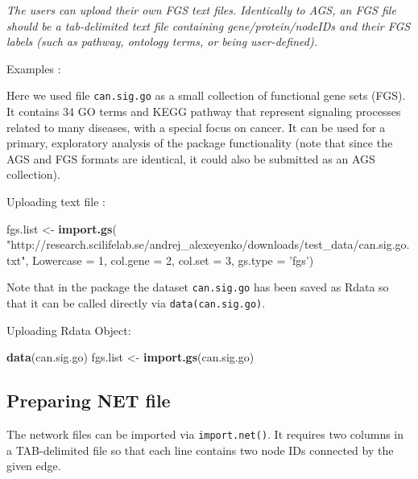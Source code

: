 \documentclass[]{article}
\newenvironment{Shaded}{\begin{snugshade}}{\end{snugshade}}
\newcommand{\KeywordTok}[1]{\textcolor[rgb]{0.13,0.29,0.53}{\textbf{#1}}}
\newcommand{\DataTypeTok}[1]{\textcolor[rgb]{0.13,0.29,0.53}{#1}}
\newcommand{\DecValTok}[1]{\textcolor[rgb]{0.00,0.00,0.81}{#1}}
\newcommand{\StringTok}[1]{\textcolor[rgb]{0.31,0.60,0.02}{#1}}
\newcommand{\NormalTok}[1]{#1}
\begin{document}
\emph{The users can upload their own FGS text files. Identically to AGS,
an FGS file should be a tab-delimited text file containing
gene/protein/nodeIDs and their FGS labels (such as pathway, ontology
terms, or being user-defined).}

Examples :

Here we used file \texttt{can.sig.go} as a small collection of
functional gene sets (FGS). It contains 34 GO terms and KEGG pathway
that represent signaling processes related to many diseases, with a
special focus on cancer. It can be used for a primary, exploratory
analysis of the package functionality (note that since the AGS and FGS
formats are identical, it could also be submitted as an AGS collection).

Uploading text file :

\begin{Shaded}
\begin{Highlighting}[]
\NormalTok{fgs.list <-}\StringTok{ }\KeywordTok{import.gs}\NormalTok{(}
\StringTok{"http://research.scilifelab.se/andrej_alexeyenko/downloads/test_data/can.sig.go.txt"}\NormalTok{,}
\DataTypeTok{Lowercase =} \DecValTok{1}\NormalTok{, }\DataTypeTok{col.gene =} \DecValTok{2}\NormalTok{, }\DataTypeTok{col.set =} \DecValTok{3}\NormalTok{, }\DataTypeTok{gs.type =} \StringTok{'fgs'}\NormalTok{)}
\end{Highlighting}
\end{Shaded}

Note that in the package the dataset \texttt{can.sig.go} has been saved
as Rdata so that it can be called directly via
\texttt{data(can.sig.go)}.

Uploading Rdata Object:

\begin{Shaded}
\begin{Highlighting}[]
\KeywordTok{data}\NormalTok{(can.sig.go)}
\NormalTok{fgs.list <-}\StringTok{ }\KeywordTok{import.gs}\NormalTok{(can.sig.go)}
\end{Highlighting}
\end{Shaded}

\hypertarget{net}{\subsection{Preparing NET file}\label{net}}

The network files can be imported via \texttt{import.net()}. It requires
two columns in a TAB-delimited file so that each line contains two node
IDs connected by the given edge.
\end{document}
